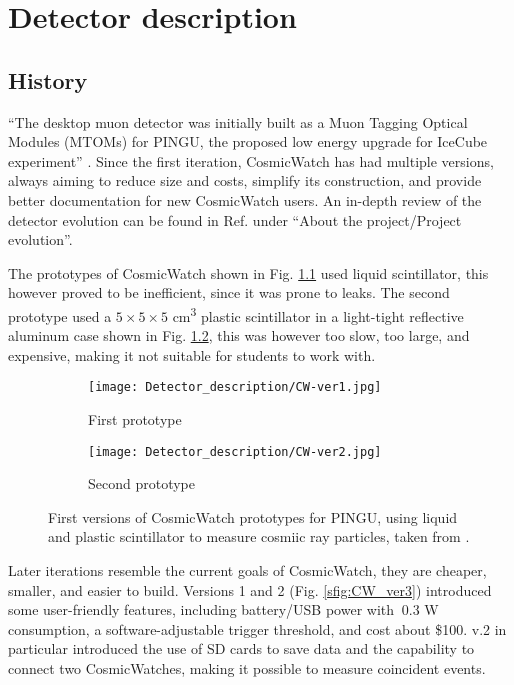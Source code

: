 \chapter{Detector description}

\section{History}

``The desktop muon detector was initially built as a Muon Tagging Optical Modules (MTOMs) for PINGU, the proposed low energy upgrade for IceCube experiment'' \cite{CosmicWatch}. Since the first iteration, CosmicWatch has had multiple versions, always aiming to reduce size and costs, simplify its construction, and provide better documentation for new CosmicWatch users. An in-depth review of the detector evolution can be found in Ref. \cite{CosmicWatch} under ``About the project/Project evolution''.

The prototypes of CosmicWatch shown in Fig. \ref{sfig:CW_ver1} used liquid scintillator, this however proved to be inefficient, since it was prone to leaks. The second prototype used a $5\times5\times5$ \unit{\cm\cubed} plastic scintillator in a light-tight reflective aluminum case shown in Fig. \ref{sfig:CW_ver2}, this was however too slow, too large, and expensive, making it not suitable for students to work with.

\begin{figure}[H]
  \centering
  \begin{subfigure}[t]{0.45\textwidth}
    \texttt{[image: Detector\_description/CW-ver1.jpg]}
    \caption{\label{sfig:CW_ver1} First prototype}
  \end{subfigure}
  \hfill
  \begin{subfigure}[t]{0.45\textwidth}
    \texttt{[image: Detector\_description/CW-ver2.jpg]}
    \caption{\label{sfig:CW_ver2} Second prototype}
  \end{subfigure}
  \caption{\label{fig:CW_ver1_ver2}First versions of CosmicWatch prototypes for PINGU, using liquid  and plastic  scintillator to measure cosmiic ray particles, taken from \cite{CosmicWatch}.}
\end{figure}

Later iterations resemble the current goals of CosmicWatch, they are cheaper, smaller, and easier to build. Versions 1 and 2 (Fig. \ref{sfig:CW_ver3}) introduced some user-friendly features, including battery/USB power with $~0.3$ \unit{\watt} consumption, a software-adjustable trigger threshold, and cost about \$100. v.2 in particular introduced the use of SD cards to save data and the capability to connect two CosmicWatches, making it possible to measure coincident events.

